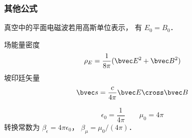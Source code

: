 \subsubsection{其他公式}
真空中的平面电磁波若用高斯单位表示， 有 $E_0 = B_0$．

场能量密度 %
\begin{equation}
\rho_E = \frac{1}{8\pi} (\bvec E^2 + \bvec B^2)
\end{equation}
坡印廷矢量
\begin{equation}
\bvec s = \frac{c}{4\pi} \bvec E \cross \bvec B
\end{equation}

\begin{equation}
\epsilon_0 = \frac{1}{4\pi} \qquad
\mu_0 = 4\pi
\end{equation}
转换常数为 $\beta_\epsilon = 4\pi\epsilon_0$， $\beta_\mu = \mu_0/(4\pi)$．
